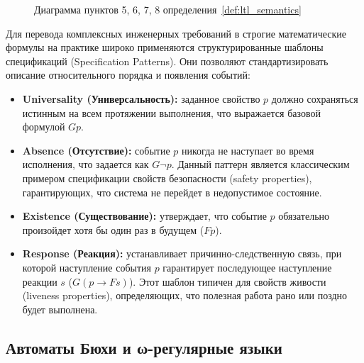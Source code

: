 \begin{figure}[htbp]
    \caption{Диаграмма пунктов 5, 6, 7, 8 определения~\ref{def:ltl_semantics}}
    \label{fig:edtl_diagram} %
\end{figure}

Для перевода комплексных инженерных требований в строгие математические формулы на практике широко применяются структурированные шаблоны спецификаций (Specification Patterns). Они позволяют стандартизировать описание относительного порядка и появления событий:
\begin{itemize}
    \item \textbf{Universality (Универсальность):} заданное свойство $p$ должно сохраняться истинным на всем протяжении выполнения, что выражается базовой формулой $Gp$.
    \item \textbf{Absence (Отсутствие):} событие $p$ никогда не наступает во время исполнения, что задается как $G\neg p$. Данный паттерн является классическим примером спецификации свойств безопасности (safety properties), гарантирующих, что система не перейдет в недопустимое состояние.
    \item \textbf{Existence (Существование):} утверждает, что событие $p$ обязательно произойдет хотя бы один раз в будущем ($Fp$).
    \item \textbf{Response (Реакция):} устанавливает причинно-следственную связь, при которой наступление события $p$ гарантирует последующее наступление реакции $s$ ($G(p \to Fs)$). Этот шаблон типичен для свойств живости (liveness properties), определяющих, что полезная работа рано или поздно будет выполнена.
\end{itemize}

\subsection{Автоматы Бюхи и ω-регулярные языки}

